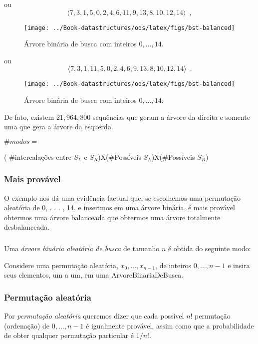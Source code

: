 \documentclass{beamer}
\newcommand{\figlabel}[1]{\label{fig:#1}}
\begin{document}
\begin{frame}
ou
\[
    \langle 7,3,1,5,0,2,4,6,11,9,13,8,10,12,14 \rangle  \enspace ,
\]
\begin{figure}
  \begin{center}
      \texttt{[image: ../Book-datastructures/ods/latex/figs/bst-balanced]}
  \end{center}
  \caption{Árvore binária de busca com inteiros $0,\ldots,14$.}
  \figlabel{rbs-lvc}
\end{figure}
\end{frame}

\begin{frame}

ou
\[
    \langle 7,3,1,11,5,0,2,4,6,9,13,8,10,12,14 \rangle \enspace .
\] 
\begin{figure}
  \begin{center}
      \texttt{[image: ../Book-datastructures/ods/latex/figs/bst-balanced]}
  \end{center}
  \caption{Árvore binária de busca com inteiros $0,\ldots,14$.}
  \figlabel{rbs-lvc}
\end{figure}

\pause
De fato, existem $21,964,800$ sequências que geram a árvore da direita e somente uma que gera a árvore da esquerda.

\end{frame}
\begin{frame}
$ \#modos = $ 

( $\#$intercalações entre $S_L$ e $S_R$)X($\#$Possíveis $S_L$)X($\#$Possíveis $S_R$)
\end{frame}
\begin{frame}
\frametitle{Mais provável}
O exemplo nos dá uma evidência factual que, se escolhemos
uma permutação aleatória de 0, . . . , 14, e inserimos em uma árvore binária,
é mais provável obtermos uma árvore balanceada que obtermos uma árvore totalmente desbalanceada.
\end{frame}

\begin{frame}
\frametitle{}

Uma \emph{árvore binária aleatória de busca}
de tamanho $n$ é obtida do seguinte modo:
  
Considere uma permutação aleatória, $x_0,\ldots,x_{n-1}$,
de inteiros $0,\ldots,n-1$ e insira seus elementos, um a um,
em uma ArvoreBinariaDeBusca.
\end{frame}

\begin{frame}
\frametitle{Permutação aleatória}
Por \emph{permutação aleatória}
queremos dizer
que cada possível $n!$ permutação (ordenação) de $0,\ldots,n-1$
é igualmente provável, assim como que a probabilidade de obter qualquer permutação particular é $1/n!$.
\end{frame}
\end{document}
